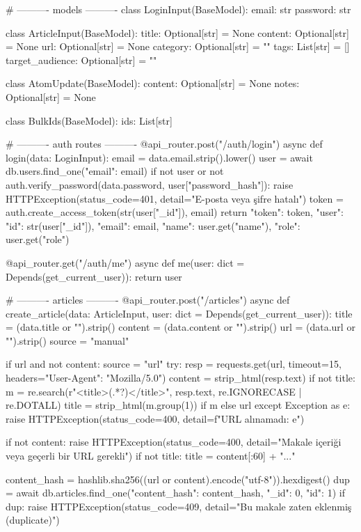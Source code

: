 # ---------- models ----------
class LoginInput(BaseModel):
    email: str
    password: str


class ArticleInput(BaseModel):
    title: Optional[str] = None
    content: Optional[str] = None
    url: Optional[str] = None
    category: Optional[str] = ""
    tags: List[str] = []
    target_audience: Optional[str] = ""


class AtomUpdate(BaseModel):
    content: Optional[str] = None
    notes: Optional[str] = None


class BulkIds(BaseModel):
    ids: List[str]


# ---------- auth routes ----------
@api_router.post("/auth/login")
async def login(data: LoginInput):
    email = data.email.strip().lower()
    user = await db.users.find_one({"email": email})
    if not user or not auth.verify_password(data.password, user["password_hash"]):
        raise HTTPException(status_code=401, detail="E-posta veya şifre hatalı")
    token = auth.create_access_token(str(user["_id"]), email)
    return {"token": token, "user": {"id": str(user["_id"]), "email": email, "name": user.get("name"), "role": user.get("role")}}


@api_router.get("/auth/me")
async def me(user: dict = Depends(get_current_user)):
    return user


# ---------- articles ----------
@api_router.post("/articles")
async def create_article(data: ArticleInput, user: dict = Depends(get_current_user)):
    title = (data.title or "").strip()
    content = (data.content or "").strip()
    url = (data.url or "").strip()
    source = "manual"

    if url and not content:
        source = "url"
        try:
            resp = requests.get(url, timeout=15, headers={"User-Agent": "Mozilla/5.0"})
            content = strip_html(resp.text)
            if not title:
                m = re.search(r"<title>(.*?)</title>", resp.text, re.IGNORECASE | re.DOTALL)
                title = strip_html(m.group(1)) if m else url
        except Exception as e:
            raise HTTPException(status_code=400, detail=f"URL alınamadı: {e}")

    if not content:
        raise HTTPException(status_code=400, detail="Makale içeriği veya geçerli bir URL gerekli")
    if not title:
        title = content[:60] + "..."

    content_hash = hashlib.sha256((url or content).encode("utf-8")).hexdigest()
    dup = await db.articles.find_one({"content_hash": content_hash}, {"_id": 0, "id": 1})
    if dup:
        raise HTTPException(status_code=409, detail="Bu makale zaten eklenmiş (duplicate)")

